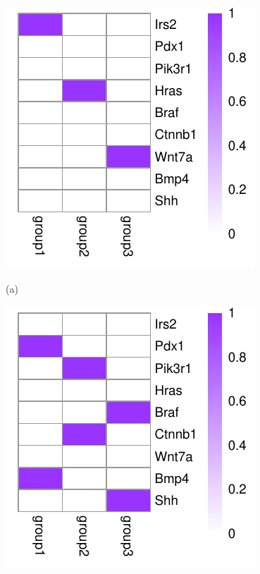 \documentclass{bmcart}
\begin{document}
\begin{figure}[!h]
  \centering
  \begin{minipage}{.20\linewidth}
  \centering
    \includegraphics[width=\linewidth]{DrawPictures/v1.pdf}
    \centerline{(a)}
  \end{minipage}
  \begin{minipage}{.20\linewidth}
   \includegraphics[width=\linewidth]{DrawPictures/v2.pdf}

\end{minipage}
\end{figure}
\end{document}
